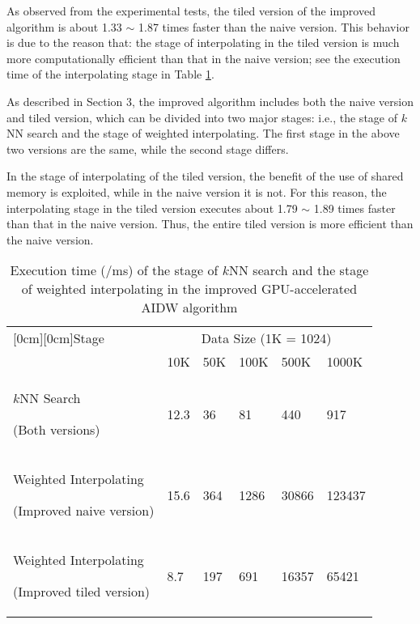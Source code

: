\documentclass[final,5p,times,twocolumn,authoryear]{elsarticle}
\begin{document}
			As observed from the experimental tests, the tiled version of the improved 
			algorithm is about 1.33 $\sim $ 1.87 times faster than the naive version. 
			This behavior is due to the reason that: the stage of interpolating in the 
			tiled version is much more computationally efficient than that in the naive 
			version; see the execution time of the interpolating stage in Table \ref{tab2}.
			
			As described in Section 3, the improved algorithm includes both the naive 
			version and tiled version, which can be divided into two major stages: i.e., 
			the stage of $k$NN search and the stage of weighted interpolating. The first 
			stage in the above two versions are the same, while the second stage 
			differs. 
			
			In the stage of interpolating of the tiled version, the benefit of the use 
			of shared memory is exploited, while in the naive version it is not. For 
			this reason, the interpolating stage in the tiled version executes about 
			1.79 $\sim $ 1.89 times faster than that in the naive version. Thus, the 
			entire tiled version is more efficient than the naive version. 
			
			\begin{table}[htbp]
			\caption{Execution time (/ms) of the stage of $k$NN search and the 
							stage of weighted interpolating in the improved GPU-accelerated AIDW 
							algorithm}
				\begin{center}
										\small
						\begin{tabular}{p{90pt}p{15pt}p{15pt}p{20pt}p{20pt}p{20pt}}
							\toprule
							\raisebox{-1.50ex}[0cm][0cm]{Stage}& 
							\multicolumn{5}{c}{Data Size (1K = 1024)}  \\
							\cline{2-6} 
							& 
						10K& 
						50K& 
						100K& 
						500K& 
						1000K \\
						\midrule
						$k$NN Search \par (Both versions)& 
						12.3& 
						36& 
						81& 
						440& 
						917 \\
						Weighted Interpolating \par (Improved naive version)& 
						15.6& 
						364& 
						1286& 
						30866& 
						123437 \\
						Weighted Interpolating \par (Improved tiled version)& 
						8.7& 
						197& 
						691& 
						16357& 
						65421 \\
						\bottomrule
					\end{tabular}
					\label{tab2}
				\end{center}
			\end{table}
			
\end{document}
